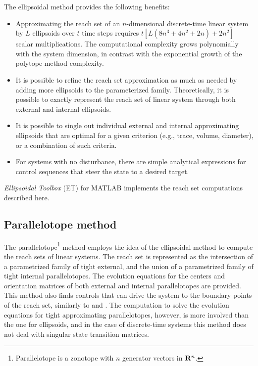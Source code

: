 The ellipsoidal method provides the following benefits:
\begin{itemize}
\item Approximating the reach set of an $n$-dimensional discrete-time
linear system by $L$ ellipsoids over $t$ time steps requires
$t[L(8n^3 + 4n^2 + 2n) + 2n^2]$ scalar multiplications.
The computational complexity grows polynomially with the system dimension,
in contrast with the exponential growth of the polytope method complexity.
\item It is possible to refine the reach set approximation as much as needed
by adding more ellipsoids to the parameterized family.
Theoretically, it is possible to exactly represent the reach set of
linear system through both external and internal ellipsoids.
\item It is possible to single out individual external and internal
approximating ellipsoids that are optimal for a given criterion (e.g., trace,
volume, diameter), or a combination of such criteria.
\item For systems with no disturbance,
there are simple analytical expressions for control
sequences that steer the state to a desired target.
\end{itemize}
\emph{Ellipsoidal Toolbox} (ET) for MATLAB \cite{toolbox} implements
the reach set computations described here.











\subsection{Parallelotope method}\label{subsec_parallelotopes}
The parallelotope\footnote{Parallelotope is a zonotope with $n$
generator vectors in ${\bf R}^n$.} method \cite{kostousova01}
employs the idea of the ellipsoidal method to compute the reach sets
of linear systems.
The reach set is represented as the intersection of a parametrized family
of tight external, and the union of a parametrized family of tight internal
parallelotopes.
The evolution equations for the centers and
orientation matrices of both external and internal parallelotopes are
provided.
This method also finds controls that can drive the system to
the boundary points of the reach set, similarly to \cite{varaiya}
and \cite{kurvar00}.
The computation to solve the evolution equations for tight approximating
parallelotopes, however, is more involved than the one for ellipsoids, and in
the case of discrete-time systems this method does not deal with singular state
transition matrices.












